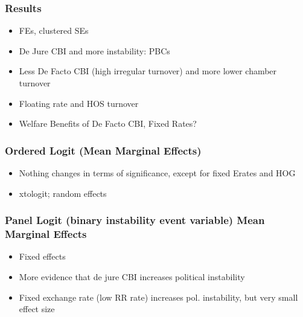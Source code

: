 \documentclass[]{beamer}
\begin{document}
    \begin{frame}
        \frametitle{Results}
        \begin{itemize}
            \item FEs, clustered SEs
            \item De Jure CBI and more instability: PBCs
            \item Less De Facto CBI (high irregular turnover) and more lower chamber turnover
            \item Floating rate and HOS turnover
            \item Welfare Benefits of De Facto CBI, Fixed Rates?
        \end{itemize}
        
        
    \end{frame}


    \begin{frame}
        \frametitle{Ordered Logit (Mean Marginal Effects)}
        \begin{itemize}
            \item Nothing changes in terms of significance, except for fixed Erates and HOG
            \item xtologit; random effects
        \end{itemize}
        
        
    \end{frame}


    \begin{frame}
        \frametitle{Panel Logit (binary instability event variable) Mean Marginal Effects}
        \begin{itemize}
            \item Fixed effects
            \item More evidence that de jure CBI increases political instability
            \item Fixed exchange rate (low RR rate) increases pol. instability, but very small effect size
        \end{itemize}
        
        
    \end{frame}
\end{document}
